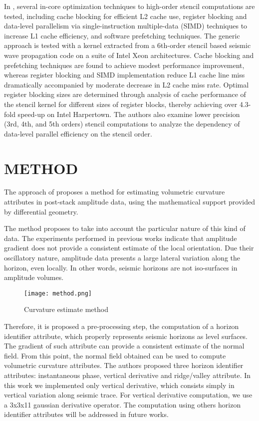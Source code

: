 \documentclass[conference]{IEEEtran}
\begin{document}
In \cite{dursun}, several in-core optimization techniques to high-order stencil computations are tested, including cache blocking for efficient L2 cache use, register blocking and data-level parallelism via single-instruction multiple-data (SIMD) techniques to increase L1 cache efficiency, and software prefetching techniques. The generic approach is tested with a kernel extracted from a 6th-order stencil based seismic wave propagation code on a suite of Intel Xeon architectures. Cache blocking and prefetching techniques are found to achieve modest performance improvement, whereas register blocking and SIMD implementation reduce L1 cache line miss dramatically accompanied by moderate decrease in L2 cache miss rate. Optimal register blocking sizes are determined through analysis of cache performance of the stencil kernel for different sizes of register blocks, thereby achieving over 4.3-fold speed-up on Intel Harpertown. The authors also examine lower precision (3rd, 4th, and 5th orders) stencil computations to analyze the dependency of data-level parallel efficiency on the stencil order.

\section{METHOD} \label{sec:method}

The approach of \cite{martins} proposes a method for estimating volumetric curvature attributes in post-stack amplitude data, using the mathematical support provided by differential geometry.

The method proposes to take into account the particular nature of this kind of data. The experiments performed in previous works \cite{silva} indicate that amplitude gradient does not provide a consistent estimate of the local orientation. Due their oscillatory nature, amplitude data presents a large lateral variation along the horizon, even locally. In other words, seismic horizons are not iso-surfaces in amplitude volumes.

\begin{figure*}[ht!]
  \centering
  \texttt{[image: method.png]}
  \caption{Curvature estimate method}
  \label{fig:method}
\end{figure*}

Therefore, it is proposed a pre-processing step, the computation of a horizon identifier attribute, which properly represents seismic horizons as level surfaces. The gradient of such attribute can provide a consistent estimate of the normal field. From this point, the normal field obtained can be used to compute volumetric curvature attributes. The authors proposed three horizon identifier attributes: instantaneous phase, vertical derivative and ridge/valley attribute. In this work we implemented only vertical derivative, which consists simply in vertical variation along seismic trace. For vertical derivative computation, we use a 3x3x11 gaussian derivative operator. The computation using others horizon identifier attributes will be addressed in future works.
\end{document}
